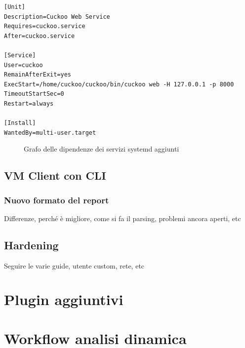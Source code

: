 \begin{code}
\begin{verbatim}
[Unit]
Description=Cuckoo Web Service
Requires=cuckoo.service
After=cuckoo.service

[Service]
User=cuckoo
RemainAfterExit=yes
ExecStart=/home/cuckoo/cuckoo/bin/cuckoo web -H 127.0.0.1 -p 8000
TimeoutStartSec=0
Restart=always

[Install]
WantedBy=multi-user.target
\end{verbatim}
\label{lst:systemd-unit-example}
\caption{Esempio di systemd unit per il servizio Web}
\end{code}
\bigskip

\begin{figure}[htbp]
\centering
{}
\caption{Grafo delle dipendenze dei servizi systemd aggiunti}
\label{fig:systemd-cuckoo-dependency-graph}
\end{figure}

\subsection{VM Client con CLI}

\subsubsection{Nuovo formato del report}
Differenze, perché è migliore, come si fa il parsing, problemi ancora aperti, etc

\subsection{Hardening}
\label{chap:dynamic-vm-hardening}
Seguire le varie guide, utente custom, rete, etc

\section{Plugin aggiuntivi}

\section{Workflow analisi dinamica}
